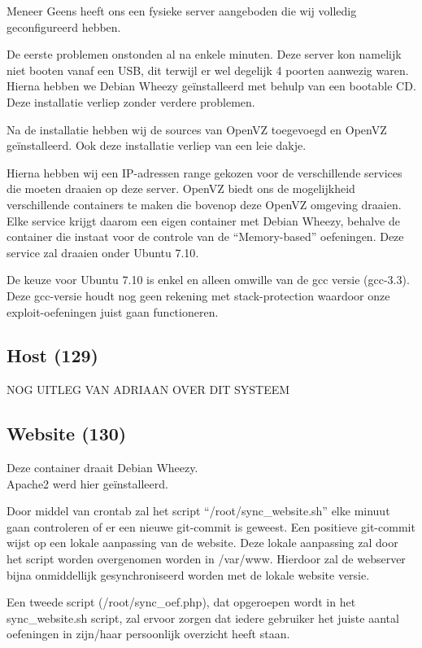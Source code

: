 Meneer Geens heeft ons een fysieke server aangeboden die wij volledig geconfigureerd hebben.

De eerste problemen onstonden al na enkele minuten. Deze server kon namelijk niet booten vanaf een USB, dit terwijl er wel degelijk 4 poorten aanwezig waren. Hierna hebben we Debian Wheezy\cite{wheezy} ge\"installeerd met behulp van een bootable CD. Deze installatie verliep zonder verdere problemen.

Na de installatie hebben wij de sources van OpenVZ\cite{openvz} toegevoegd en OpenVZ ge\"installeerd.
Ook deze installatie verliep van een leie dakje.

Hierna hebben wij een IP-adressen range gekozen voor de verschillende services die moeten draaien op deze server. OpenVZ biedt ons de mogelijkheid verschillende containers\cite{openvzcontainers} te maken die bovenop deze OpenVZ omgeving draaien. Elke service krijgt daarom een eigen container met Debian Wheezy, behalve de container die instaat voor de controle van de ``Memory-based'' oefeningen. Deze service zal draaien onder Ubuntu 7.10\cite{openvzubuntu}.

De keuze voor Ubuntu 7.10 is enkel en alleen omwille van de gcc\cite{gcc} versie (gcc-3.3). Deze gcc-versie houdt nog geen rekening met stack-protection waardoor onze exploit-oefeningen juist gaan functioneren.

\subsection{Host (129)}
NOG UITLEG VAN ADRIAAN OVER DIT SYSTEEM

\subsection{Website (130)}
Deze container draait Debian Wheezy.\\
Apache2\cite{apache} werd hier ge\"installeerd.

Door middel van crontab zal het script ``/root/sync\_website.sh'' elke minuut gaan controleren of er een nieuwe git-commit is geweest. Een positieve git-commit wijst op een lokale aanpassing van de website. Deze lokale aanpassing zal door het script worden overgenomen worden in /var/www. Hierdoor zal de webserver bijna onmiddellijk gesynchroniseerd worden met de lokale website versie.

Een tweede script (/root/sync\_oef.php), dat opgeroepen wordt in het sync\_website.sh script, zal ervoor zorgen dat iedere gebruiker het juiste aantal oefeningen in zijn/haar persoonlijk overzicht heeft staan.

